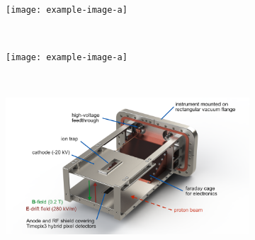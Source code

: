 \begin{figure}[!ht]
  \centering
  \begin{subfigure}[t]{.3\textwidth}
    \texttt{[image: example-image-a]}
    \caption{}
    \label{}
  \end{subfigure}
  ~
  \begin{subfigure}[t]{0.3\textwidth}
    \texttt{[image: example-image-a]}
    \caption{}
    \label{}
  \end{subfigure}
  ~
  \begin{subfigure}[t]{0.3\textwidth}
    \includegraphics[width=\textwidth]{02_BeamDiag/figures/fig000_IPM_3}
    \caption{}
    \label{}
  \end{subfigure}
  \caption[]{}
  \label{chap:}
\end{figure}
